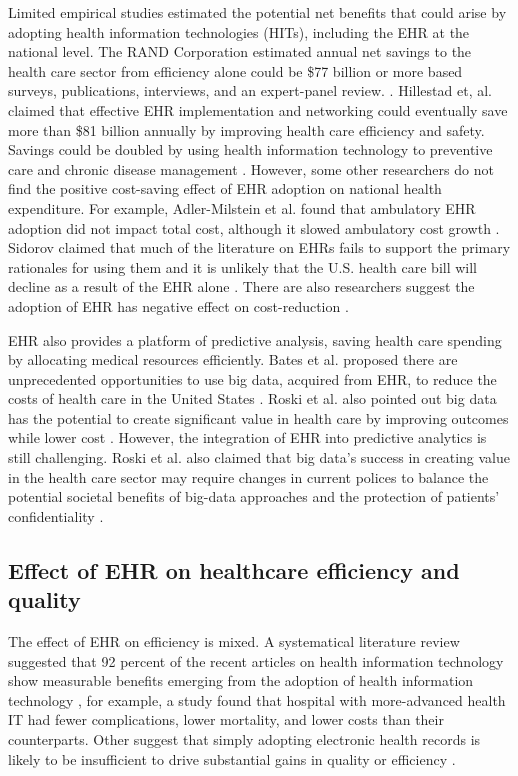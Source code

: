 Limited empirical studies estimated the potential net benefits that could arise by adopting health information technologies (HITs), including the EHR at the national level. The RAND Corporation estimated annual net savings to the health care sector from efficiency alone could be \$77 billion or more based surveys, publications, interviews, and an expert-panel review. \citep{Rand2005}. Hillestad et, al. claimed that effective EHR implementation and networking could eventually save more than \$81 billion annually by improving health care efficiency and safety. Savings could be doubled by using health information technology to preventive care and chronic disease management \citep{Hillestad2005}. However, some other researchers do not find the positive cost-saving effect of EHR adoption on national health expenditure. For example, Adler-Milstein et al. found that ambulatory EHR adoption did not impact total cost, although it slowed ambulatory cost growth \citep{Adler-Milstein2013}. Sidorov claimed that much of the literature on EHRs fails to support the primary rationales for using them and it is unlikely that the U.S. health care bill will decline as a result of the EHR alone \citep{Sidorov2006}. There are also researchers suggest the adoption of EHR has negative effect on cost-reduction  \citep{Teufel2012}.

EHR also provides a platform of predictive analysis, saving health care spending by allocating medical resources efficiently. Bates et al. proposed there are unprecedented opportunities to use big data, acquired from EHR, to reduce the costs of health care in the United States \citep{Bates2014}. Roski et al. also pointed out big data has the potential to create significant value in health care by improving outcomes while lower cost \citep{Roski2014}. However, the integration of EHR into predictive analytics is still challenging. Roski et al. also claimed that big data's success in creating value in the health care sector may require changes in current polices to balance the potential societal benefits of big-data approaches and the protection of patients' confidentiality \citep{Roski2014}.

\subsection{Effect of EHR on healthcare efficiency and quality}

The effect of EHR on efficiency is mixed. A systematical literature review suggested that 92 percent of the recent articles on health information technology show measurable benefits emerging from the adoption of health information technology \citep{Buntin2011}, for example, a study found that hospital with more-advanced health IT had fewer complications, lower mortality, and lower costs than their counterparts\citep{amarasingham2009clinical}. Other suggest that simply adopting electronic health records is likely to be insufficient to drive substantial gains in quality or efficiency \citep{DesRoches2010}. 


